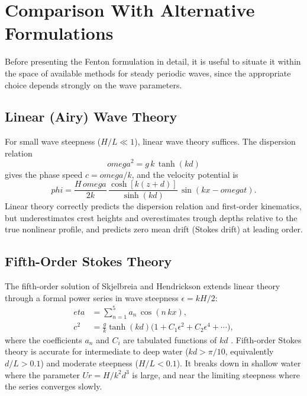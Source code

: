 \documentclass[journal,10pt,twocolumn]{IEEEtran}
\def\omega{omega}%
\def\eta{eta}%
\def\phi{phi}%
\begin{document}
\section{Comparison With Alternative Formulations}
\label{sec:comparison}

Before presenting the Fenton formulation in detail, it is useful to
situate it within the space of available methods for steady periodic
waves, since the appropriate choice depends strongly on the wave
parameters.

\subsection{Linear (Airy) Wave Theory}

For small wave steepness ($H/L \ll 1$), linear wave theory suffices.
The dispersion relation
\begin{equation}
    \omega^2 = g\,k\,\tanh(kd)
    \label{eq:dispersion_linear}
\end{equation}
gives the phase speed $c = \omega/k$, and the velocity potential is
\begin{equation}
    \phi = \frac{H\,\omega}{2k}\,
           \frac{\cosh[k(z+d)]}{\sinh(kd)}\,
           \sin(kx - \omega t).
\end{equation}
Linear theory correctly predicts the dispersion relation and
first-order kinematics, but underestimates crest heights and
overestimates trough depths relative to the true nonlinear profile,
and predicts zero mean drift (Stokes drift) at leading order.

\subsection{Fifth-Order Stokes Theory}

The fifth-order solution of Skjelbreia and Hendrickson
\cite{Skjelbreia1960} extends linear theory through a formal power
series in wave steepness $\epsilon = kH/2$:
\begin{align}
    \eta &= \sum_{n=1}^{5} a_n\,\cos(n\,kx),\\
    c^2  &= \frac{g}{k}\tanh(kd)
             \bigl(1 + C_1\epsilon^2 + C_2\epsilon^4 + \cdots\bigr),
\end{align}
where the coefficients $a_n$ and $C_i$ are tabulated functions of
$kd$ \cite{Skjelbreia1960}.
Fifth-order Stokes theory is accurate for intermediate to deep water
($kd > \pi/10$, equivalently $d/L > 0.1$) and moderate steepness
($H/L < 0.1$).
It breaks down in shallow water where the parameter $Ur = H/k^2d^3$
is large, and near the limiting steepness where the series converges
slowly.
\end{document}
